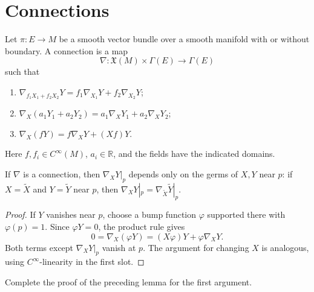 \section{Connections}

\begin{definition}[Connection]
\label{def:connection}
\leanok
Let $\pi:E\to M$ be a smooth vector bundle over a smooth manifold with or without boundary. A connection is a map
\[
\nabla:\mathfrak X(M)\times\Gamma(E)\to\Gamma(E)
\]
such that
\begin{enumerate}
\item[(i)] $\nabla_{f_1X_1+f_2X_2}Y=f_1\nabla_{X_1}Y+f_2\nabla_{X_2}Y$;
\item[(ii)] $\nabla_X(a_1Y_1+a_2Y_2)=a_1\nabla_XY_1+a_2\nabla_XY_2$;
\item[(iii)] $\nabla_X(fY)=f\nabla_XY+(Xf)Y$.
\end{enumerate}
Here $f,f_i\in C^\infty(M)$, $a_i\in\mathbb R$, and the fields have the indicated domains.
\end{definition}

\begin{lemma}[Locality]
\label{lem:connection-is-local-operator}
\leanok
If $\nabla$ is a connection, then $\nabla_XY|_p$ depends only on the germs of $X,Y$ near $p$: if $X=\widetilde X$ and $Y=\widetilde Y$ near $p$, then $\nabla_XY|_p=\nabla_{\widetilde X}\widetilde Y|_p$.
\end{lemma}
\begin{proof}
\leanok
\sketch If $Y$ vanishes near $p$, choose a bump function $\varphi$ supported there with $\varphi(p)=1$. Since $\varphi Y=0$, the product rule gives
\begin{equation}
0=\nabla_X(\varphi Y)=(X\varphi)Y+\varphi\nabla_XY.\tag{4.5}
\end{equation}
Both terms except $\nabla_XY|_p$ vanish at $p$. The argument for changing $X$ is analogous, using $C^\infty$-linearity in the first slot.
\end{proof}

\begin{exercise}\label{exer:lemma-4-1-comparison}
Complete the proof of the preceding lemma for the first argument.
\end{exercise}

